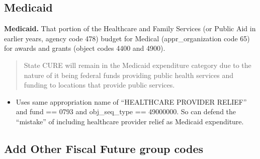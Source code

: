 \documentclass[
  letterpaper,
  DIV=11,
  numbers=noendperiod]{scrreport}
\providecommand{\tightlist}{%
  \setlength{\itemsep}{0pt}\setlength{\parskip}{0pt}}\usepackage{longtable,booktabs,array}
\begin{document}
\hypertarget{medicaid-1}{%
\subsection{Medicaid}\label{medicaid-1}}

\textbf{Medicaid.} That portion of the Healthcare and Family Services
(or Public Aid in earlier years, agency code 478) budget for Medical
(appr\_organization code 65) for awards and grants (object codes 4400
and 4900).

\begin{quote}
State CURE will remain in the Medicaid expenditure category due to the
nature of it being federal funds providing public health services and
funding to locations that provide public services.
\end{quote}

\begin{itemize}
\tightlist
\item
  Uses same appropriation name of ``HEALTHCARE PROVIDER RELIEF'' and
  fund == 0793 and obj\_seq\_type == 49000000. So can defend the
  ``mistake'' of including healthcare provider relief as Medicaid
  expenditure.
\end{itemize}

\hypertarget{add-other-fiscal-future-group-codes}{%
\subsection{Add Other Fiscal Future group
codes}\label{add-other-fiscal-future-group-codes}}
\end{document}

